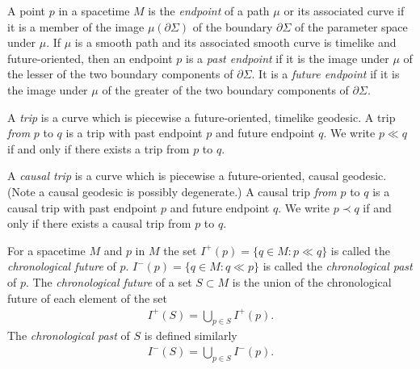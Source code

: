 \begin{definition}[Endpoints]
    \label{def:endpoints}
    A point $p$ in a spacetime $M$ is the \textit{endpoint} of a path $\mu$ or its associated curve if it is a member of the image $\mu(\partial\Sigma)$ of the boundary $\partial\Sigma$ of the parameter space under $\mu$. If $\mu$ is a smooth path and its associated smooth curve is timelike and future-oriented, then an endpoint $p$ is a \textit{past endpoint} if it is the image under $\mu$ of the lesser of the two boundary components of $\partial\Sigma$. It is a \textit{future endpoint} if it is the image under $\mu$ of the greater of the two boundary components of $\partial\Sigma$.
\end{definition}

\begin{definition}[Trip]
    \label{def:trip}
    A \textit{trip} is a curve which is piecewise a future-oriented, timelike geodesic. A trip \textit{from} $p$ to $q$ is a trip with past endpoint $p$ and future endpoint $q$. We write $p \ll q$ if and only if there exists a trip from $p$ to $q$.
\end{definition}

\begin{definition}
    \label{def:causal-trip}
    A \textit{causal trip} is a curve which is piecewise a future-oriented, causal geodesic. (Note a causal geodesic is possibly degenerate.) A causal trip \textit{from} $p$ to $q$ is a causal trip with past endpoint $p$ and future endpoint $q$. We write $p \prec q$ if and only if there exists a causal trip from $p$ to $q$.
\end{definition}

\begin{definition}
    \label{def:chronological-future-and-chronological-past}
    For a spacetime $M$ and $p$ in $M$ the set $I^+(p) = \{q \in M : p \ll q\}$ is called the \textit{chronological future} of $p$. $I^-(p) = \{q \in M : q \ll p\}$ is called the \textit{chronological past} of $p$. The \textit{chronological future} of a set $S \subset M$ is the union of the chronological future of each element of the set
    \begin{align}
        I^+(S) = \bigcup\limits_{p \in S} I^+(p).
    \end{align}
    The \textit{chronological past} of $S$ is defined similarly
    \begin{align}
        I^-(S) = \bigcup\limits_{p \in S} I^-(p).
    \end{align}
\end{definition}

